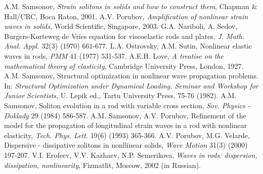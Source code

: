 \documentclass[12pt, a4paper]{report}
\begin{document}
\begin{thebibliography}{99}
	 A.M. Samsonov, \textit{Strain solitons in solids and how to construct them}, Chapman \& Hall/CRC, Boca Raton, 2001.
	 A.V. Porubov, \textit{Amplification of nonlinear strain waves in solids}, World Scientific, Singapore, 2003.
	G.A. Nariboli, A. Sedov, Burgers-Korteweg de Vries equation for viscoelastic rods and plates, \textit{J. Math. Anal. Appl.} 32(3) (1970) 661-677.
	 L.A. Ostrovsky, A.M. Sutin, Nonlinear elastic waves in rods, \textit{PMM} 41 (1977) 531-537.
	 A.E.H. Love, \textit{A treatise on the mathematical theory of elasticity}, Cambridge University Press, London, 1927.
	A.M. Samsonov, Structural optimization in nonlinear wave propagation problems. In: \textit{Structural Optimization under Dynamical Loading. Seminar and Workshop for Junior Scientists}, U. Lepik ed., Tartu University Press, 75-76 (1982).
	A.M. Samsonov, Soliton evolution in a rod with variable cross section, \textit{Sov. Physics - Doklady} 29 (1984) 586-587.
	A.M. Samsonov, A.V. Porubov, Refinement of the model for the propagation of longitudinal strain waves in a rod with nonlinear elasticity, \textit{Tech. Phys. Lett.} 19(6) (1993) 365-366.
	A.V. Porubov, M.G. Velarde, Dispersive - dissipative solitons in nonllinear solids, \textit{Wave Motion} 31(3) (2000) 197-207.
	 V.I. Erofeev, V.V. Kazhaev, N.P. Semerikova, \textit{Waves in rods: dispersion, dissipation, nonlinearity}, Fizmatlit, Moscow, 2002 (in Russian).

\end{thebibliography}
\end{document}
